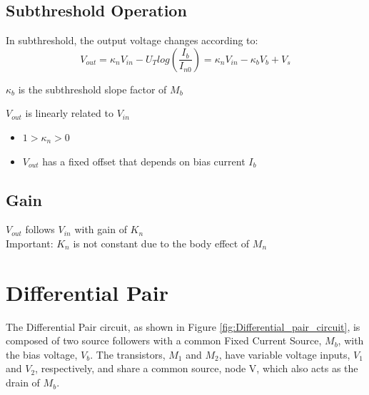 \subsection{Subthreshold Operation}
In subthreshold, the output voltage changes according to:
\begin{equation}
V_{out}=\kappa_n V_{in} - U_T log(\frac{I_b}{I_{n0}}) = \kappa_n V_{in} - \kappa_b V_b + V_s
\end{equation}
\begin{center}
$\kappa_b$ is the subthreshold slope factor of $M_b$\\
\end{center}
$V_{out}$ is linearly related to $V_{in}$
\begin{itemize}[label={}]
\item $1 >\kappa_n >0$
\item $V_{out}$ has a fixed offset that depends on bias current $I_b$
\end{itemize}

\subsection{Gain}
$V_{out}$ follows $V_{in}$ with gain of $K_n$\\
Important: $K_n$ is not constant due to the body effect of $M_n$









\section{Differential Pair}

The Differential Pair circuit, as shown in Figure \ref{fig:Differential_pair_circuit}, is composed of two source followers with a common Fixed Current Source, $M_b$, with the bias voltage, $V_b$. The transistors, $M_1$ and $M_2$, have variable voltage inputs, $V_1$ and $V_2$, respectively, and share a common source, node V, which also acts as the drain of $M_b$. 


